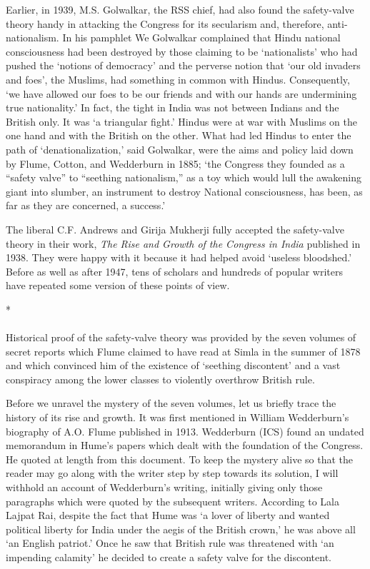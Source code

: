\begin{multicols}{2}
Earlier, in 1939, M.S. Golwalkar, the RSS chief, had also found the safety-valve theory handy in attacking the Congress for its secularism and, therefore, anti-nationalism. In his pamphlet We Golwalkar complained that Hindu national consciousness had been destroyed by those claiming to be `nationalists' who had pushed the `notions of democracy' and the perverse notion that `our old invaders and foes', the Muslims, had something in common with Hindus. Consequently, `we have allowed our foes to be our friends and with our hands are undermining true nationality.' In fact, the tight in India was not between Indians and the British only. It was `a triangular fight.' Hindus were at war with Muslims on the one hand and with the British on the other. What had led Hindus to enter the path of `denationalization,' said Golwalkar, were the aims and policy laid down by Flume, Cotton, and Wedderburn in 1885; `the Congress they founded as a ``safety valve'' to ``seething nationalism,'' as a toy which would lull the awakening giant into slumber, an instrument to destroy National consciousness, has been, as far as they are concerned, a success.'

The liberal C.F. Andrews and Girija Mukherji fully accepted the safety-valve theory in their work, \textit{The Rise and Growth of the Congress in India} published in 1938. They were happy with it because it had helped avoid `useless bloodshed.' Before as well as after 1947, tens of scholars and hundreds of popular writers have repeated some version of these points of view.

\begin{center}*\end{center}

\paragraph*{}
Historical proof of the safety-valve theory was provided by the seven volumes of secret reports which Flume claimed to have read at Simla in the summer of 1878 and which convinced him of the existence of `seething discontent' and a vast conspiracy among the lower classes to violently overthrow British rule.

Before we unravel the mystery of the seven volumes, let us briefly trace the history of its rise and growth. It was first mentioned in William Wedderburn's biography of A.O. Flume published in 1913. Wedderburn (ICS) found an undated memorandum in Hume's papers which dealt with the foundation of the Congress. He quoted at length from this document. To keep the mystery alive so that the reader may go along with the writer step by step towards its solution, I will withhold an account of Wedderburn's writing, initially giving only those paragraphs which were quoted by the subsequent writers. According to Lala Lajpat Rai, despite the fact that Hume was `a lover of liberty and wanted political liberty for India under the aegis of the British crown,' he was above all `an English patriot.' Once he saw that British rule was threatened with `an impending calamity' he decided to create a safety valve for the discontent.


\end{multicols}
